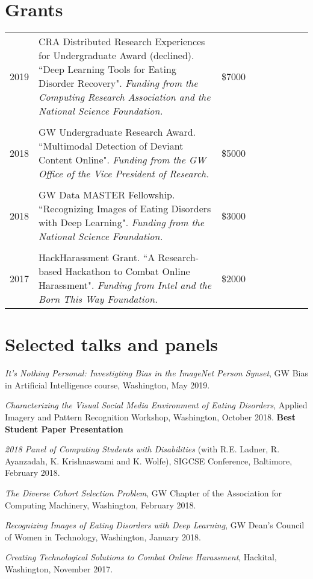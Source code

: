 \documentclass[a4paper,10pt]{article}
\begin{document}
\section{Grants}
{\def\next{\\\\[-0.2cm]}\fontsize{10}{12pt}\selectfont
\begin{tabular}{@{}lP{13.3cm}r@{}}

2019  &   CRA Distributed Research Experiences for Undergraduate Award (declined). ``Deep Learning Tools for Eating Disorder Recovery". \emph{Funding from the Computing Research Association and the National Science Foundation.} &\$7000 \next
2018 	& 	GW Undergraduate Research Award. ``Multimodal Detection of Deviant Content Online". \emph{Funding from the GW Office of the Vice President of Research.} &\$5000 \next
2018 	& 	GW Data MASTER Fellowship. ``Recognizing Images of Eating Disorders with Deep Learning". \emph{Funding from the National Science Foundation.} &\$3000 \next
2017	 	& 	HackHarassment Grant. ``A Research-based Hackathon to Combat Online Harassment".  \emph{Funding from Intel and the Born This Way Foundation.} &\$2000

\end{tabular}}

\setlength{\bibitemsep}{1.8pt}
\begin{publications}
\end{publications}
%
\section{Selected talks and panels}
\begin{compactitem}\itemsep=0.1cm
\item \emph{It's Nothing Personal: Investigting Bias in the ImageNet Person Synset}, GW Bias in Artificial Intelligence course, Washington, May 2019.
\item \emph{Characterizing the Visual Social Media Environment of Eating Disorders}, Applied Imagery and Pattern Recognition Workshop, Washington, October 2018. \textbf{Best Student Paper Presentation}
\item  \emph{2018 Panel of Computing Students with Disabilities} (with R.E. Ladner, R. Ayanzadah, K. Krishnaswami and K. Wolfe), SIGCSE Conference, Baltimore, February 2018.
\item \emph{The Diverse Cohort Selection Problem}, GW Chapter of the Association for Computing Machinery, Washington, February 2018.
\item \emph{Recognizing Images of Eating Disorders with Deep Learning}, GW Dean's Council of Women in Technology, Washington, January 2018.
\item \emph{Creating Technological Solutions to Combat Online Harassment}, Hackital, Washington, November 2017.
\end{compactitem}
\end{document}
